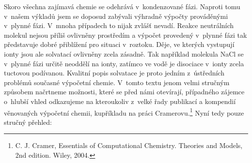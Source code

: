 Skoro všechna zajímavá chemie se odehrává v~kondenzované fázi. Naproti tomu v~našem výkladů jsem se doposud zabývali výhradně výpočty prováděnými v~plynné fázi. V~mnoha případech to nijak zvlášť nevadí. Reakce neutrálních molekul nejsou příliš ovlivněny prostředím a výpočet provedený v~plynné fázi tak představuje dobré přiblížení pro situaci v~roztoku.
Děje, ve kterých vystupují ionty jsou ale solvatací ovlivněny zcela zásadně. Tak například molekula NaCl se v~plynné fázi určitě neoddělí na ionty, zatímco ve vodě je disociace v~ionty zcela tuctovou podívanou.
Kvalitní popis solvatace je proto jedním z~ústředních problémů současné výpočetní chemie. V~tomto textu jenom velmi stručným způsobem načrtneme možnosti, které se před námi otevírají, případného zájemce o~hlubší vhled odkazujeme na kteroukoliv z~velké řady publikací a kompendií věnovaných výpočetní chemii, kupříkladu na práci Cramerovu.\footnote{C. J. Cramer, Essentials of Computational Chemistry. Theories and Models, 2nd edition. Wiley, 2004.} Nyní tedy pouze stručný přehled:

